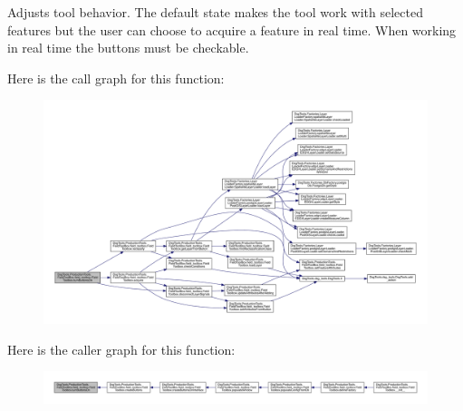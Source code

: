 \begin{DoxyVerb}Adjusts tool behavior. The default state makes the tool work with selected features
but the user can choose to acquire a feature in real time. When working in real time the buttons must be checkable.
\end{DoxyVerb}
 Here is the call graph for this function\+:
\nopagebreak
\begin{figure}[H]
\begin{center}
\leavevmode
\includegraphics[width=350pt]{class_dsg_tools_1_1_production_tools_1_1_field_tool_box_1_1field__toolbox_1_1_field_toolbox_af088d3efaf955572f22d8f3ac308a60f_cgraph}
\end{center}
\end{figure}
Here is the caller graph for this function\+:
\nopagebreak
\begin{figure}[H]
\begin{center}
\leavevmode
\includegraphics[width=350pt]{class_dsg_tools_1_1_production_tools_1_1_field_tool_box_1_1field__toolbox_1_1_field_toolbox_af088d3efaf955572f22d8f3ac308a60f_icgraph}
\end{center}
\end{figure}
\mbox{\label{class_dsg_tools_1_1_production_tools_1_1_field_tool_box_1_1field__toolbox_1_1_field_toolbox_a34c6f8bc997fd96fffcdf9ee5ed9f94b}} 
